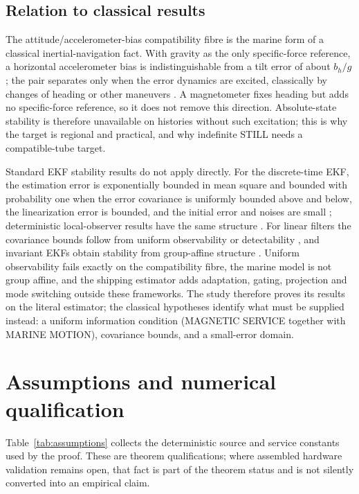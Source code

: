 \documentclass[journal]{IEEEtran}
\begin{document}
\subsection{Relation to classical results}
The attitude/accelerometer-bias compatibility fibre is the marine form of a
classical inertial-navigation fact.  With gravity as the only specific-force
reference, a horizontal accelerometer bias is indistinguishable from a tilt
error of about $b_h/g$; the pair separates only when the error dynamics are
excited, classically by changes of heading or other maneuvers
\cite{TittertonWeston2004_Strapdown,GoshenMeskin1992_PWCSTheory,GoshenMeskin1992_PWCSAlignment,Hong2005_GPSINSObservability}.
A magnetometer fixes heading but adds no specific-force reference, so it does
not remove this direction.  Absolute-state stability is therefore unavailable
on histories without such excitation; this is why the target is regional and
practical, and why indefinite STILL needs a compatible-tube target.

Standard EKF stability results do not apply directly.  For the discrete-time
EKF, the estimation error is exponentially bounded in mean square and bounded
with probability one when the error covariance is uniformly bounded above and
below, the linearization error is bounded, and the initial error and noises
are small \cite{Reif1999_EKFStochasticStability}; deterministic local-observer
results have the same structure \cite{Boutayeb1997_EKFObserverConvergence}.
For linear filters the covariance bounds follow from uniform observability or
detectability \cite{Jazwinski1970_Filtering,AndersonMoore1981_DetectabilityStabilizability},
and invariant EKFs obtain stability from group-affine structure
\cite{BarrauBonnabel2017_IEKF}.  Uniform observability fails exactly on the
compatibility fibre, the marine model is not group affine, and the shipping
estimator adds adaptation, gating, projection and mode switching outside
these frameworks.  The study therefore proves its results on the literal
estimator; the classical hypotheses identify what must be supplied instead:
a uniform information condition (MAGNETIC SERVICE together with MARINE
MOTION), covariance bounds, and a small-error domain.

\section{Assumptions and numerical qualification}
Table~\ref{tab:assumptions} collects the deterministic source and service
constants used by the proof.  These are theorem qualifications; where assembled
hardware validation remains open, that fact is part of the theorem status and
is not silently converted into an empirical claim.
\end{document}
